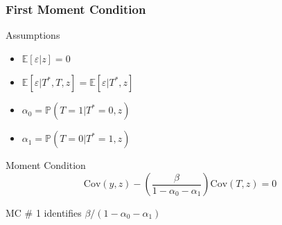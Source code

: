 \documentclass{beamer}
\begin{document}
%
%  
%
%
%
\begin{frame}
  \frametitle{First Moment Condition}
  \begin{block}{Assumptions}
    \begin{itemize}
      \item $\mathbb{E}[\varepsilon|z]=0$
      \item $\mathbb{E}[\varepsilon|T^*,T,z] =  \mathbb{E}[\varepsilon|T^*,z]$
      \item $\alpha_0 = \mathbb{P}(T = 1| T^* = 0, z)$ 
      \item  $\alpha_1 = \mathbb{P}(T = 0| T^* = 1, z)$ 
    \end{itemize}
  \end{block}

  \begin{block}{Moment Condition}
    \[\mbox{Cov}(y,z) - \left( \frac{\beta}{1 - \alpha_0 - \alpha_1} \right) \mbox{Cov}(T,z) = 0\]
  \end{block}

  \alert{MC \# 1 identifies $\beta/(1 - \alpha_0 - \alpha_1)$}
\end{frame}
\end{document}
